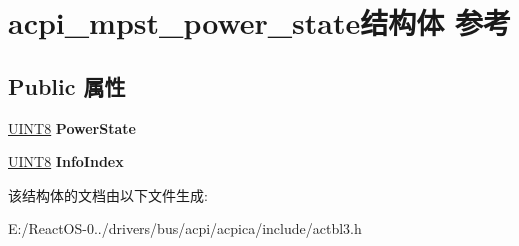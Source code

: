 \hypertarget{structacpi__mpst__power__state}{}\section{acpi\+\_\+mpst\+\_\+power\+\_\+state结构体 参考}
\label{structacpi__mpst__power__state}
\subsection*{Public 属性}
\begin{DoxyCompactItemize}
\item 
\mbox{\label{structacpi__mpst__power__state_ae801fd101a744d1c9364f45da32cedb3}} 
\hyperlink{_processor_bind_8h_ab27e9918b538ce9d8ca692479b375b6a}{U\+I\+N\+T8} {\bfseries Power\+State}
\item 
\mbox{\label{structacpi__mpst__power__state_ab809f7d433a7ef032fc2d048b133a60b}} 
\hyperlink{_processor_bind_8h_ab27e9918b538ce9d8ca692479b375b6a}{U\+I\+N\+T8} {\bfseries Info\+Index}
\end{DoxyCompactItemize}


该结构体的文档由以下文件生成\+:\begin{DoxyCompactItemize}
\item 
E\+:/\+React\+O\+S-\/0../drivers/bus/acpi/acpica/include/actbl3.\+h\end{DoxyCompactItemize}
